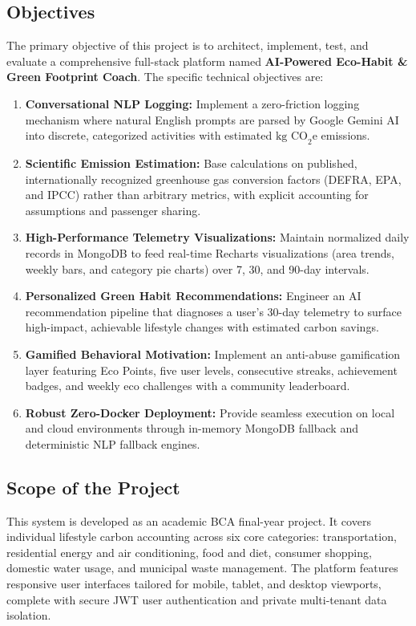 \documentclass[12pt,a4paper]{article}
\begin{document}
\subsection{Objectives}
The primary objective of this project is to architect, implement, test, and evaluate a comprehensive full-stack platform named \textbf{AI-Powered Eco-Habit \& Green Footprint Coach}. The specific technical objectives are:
\begin{enumerate}
    \item \textbf{Conversational NLP Logging:} Implement a zero-friction logging mechanism where natural English prompts are parsed by Google Gemini AI into discrete, categorized activities with estimated $\text{kg CO}_2\text{e}$ emissions.
    \item \textbf{Scientific Emission Estimation:} Base calculations on published, internationally recognized greenhouse gas conversion factors (DEFRA, EPA, and IPCC) rather than arbitrary metrics, with explicit accounting for assumptions and passenger sharing.
    \item \textbf{High-Performance Telemetry Visualizations:} Maintain normalized daily records in MongoDB to feed real-time Recharts visualizations (area trends, weekly bars, and category pie charts) over 7, 30, and 90-day intervals.
    \item \textbf{Personalized Green Habit Recommendations:} Engineer an AI recommendation pipeline that diagnoses a user's 30-day telemetry to surface high-impact, achievable lifestyle changes with estimated carbon savings.
    \item \textbf{Gamified Behavioral Motivation:} Implement an anti-abuse gamification layer featuring Eco Points, five user levels, consecutive streaks, achievement badges, and weekly eco challenges with a community leaderboard.
    \item \textbf{Robust Zero-Docker Deployment:} Provide seamless execution on local and cloud environments through in-memory MongoDB fallback and deterministic NLP fallback engines.
\end{enumerate}

\subsection{Scope of the Project}
This system is developed as an academic BCA final-year project. It covers individual lifestyle carbon accounting across six core categories: transportation, residential energy and air conditioning, food and diet, consumer shopping, domestic water usage, and municipal waste management. The platform features responsive user interfaces tailored for mobile, tablet, and desktop viewports, complete with secure JWT user authentication and private multi-tenant data isolation.
\end{document}
